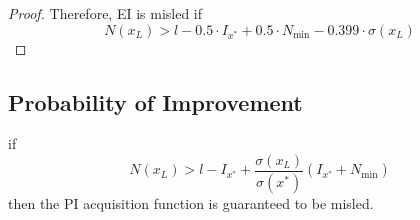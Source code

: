 {\begin{proof}
Therefore, EI is misled if
\begin{equation*}
    N(x_L) > l - 0.5 \cdot I_{x^*} + 0.5 \cdot N_{\min} - 0.399 \cdot \sigma(x_L)
\end{equation*}
\end{proof}




\subsection{Probability of Improvement}
\begin{theorem}
if
\begin{equation*}
    N(x_L) > l - I_{x^*} + \frac{\sigma(x_L)}{\sigma(x^*)} (I_{x^*} + N_{\min})
\end{equation*}
then the PI acquisition function is guaranteed to be misled.
\end{theorem}

}
